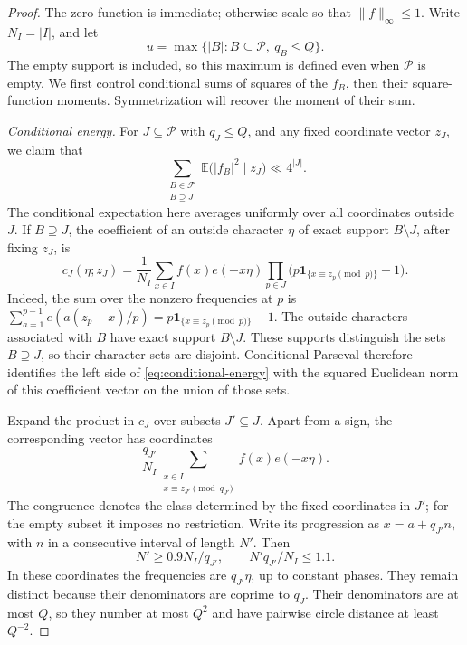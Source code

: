 \begin{proof}
The zero function is immediate; otherwise scale so that
\(\|f\|_\infty\le1\).  Write \(N_I=|I|\), and let
\[
 u=\max\{|B|:B\subseteq\mathcal P,\ q_B\le Q\}.
\]
The empty support is included, so this maximum is defined even when
\(\mathcal P\) is empty.
We first control conditional sums of squares of the \(f_B\), then their
square-function moments.  Symmetrization will recover the moment of
their sum.

\smallskip
\noindent\emph{Conditional energy.}
For \(J\subseteq\mathcal P\) with \(q_J\le Q\), and any fixed
coordinate vector \(z_J\), we claim that
\begin{equation}
 \sum_{\substack{B\in\mathcal F\\B\supseteq J}}
       \mathbb E\bigl(|f_B|^2\mid z_J\bigr)\ll4^{|J|}.
 \label{eq:conditional-energy}
\end{equation}
The conditional expectation here averages uniformly over all coordinates
outside \(J\).  If \(B\supseteq J\), the coefficient of an outside
character \(\eta\) of exact support \(B\setminus J\), after fixing
\(z_J\), is
\[
 c_J(\eta;z_J)
 =\frac1{N_I}\sum_{x\in I}f(x)e(-x\eta)
       \prod_{p\in J}\bigl(p\mathbf 1_{\{x\equiv z_p\pmod p\}}-1\bigr).
\]
Indeed, the sum over the nonzero frequencies at \(p\) is
\(\sum_{a=1}^{p-1}e(a(z_p-x)/p)
=p\mathbf 1_{\{x\equiv z_p\pmod p\}}-1\).
The outside characters associated with \(B\) have exact support
\(B\setminus J\).  These supports distinguish the sets \(B\supseteq J\),
so their character sets are disjoint.  Conditional Parseval therefore
identifies the left side of \eqref{eq:conditional-energy} with the squared
Euclidean norm of this coefficient vector on the union of those sets.

Expand the product in \(c_J\) over subsets \(J'\subseteq J\).
Apart from a sign, the corresponding vector has coordinates
\[
 \frac{q_{J'}}{N_I}
 \sum_{\substack{x\in I\\x\equiv z_{J'}\pmod{q_{J'}}}}
                   f(x)e(-x\eta).
\]
The congruence denotes the class determined by the fixed coordinates in
\(J'\); for the empty subset it imposes no restriction.  Write its
progression as \(x=a+q_{J'}n\), with \(n\) in a consecutive interval
of length \(N'\).  Then
\[
 N'\ge0.9N_I/q_{J'},
 \qquad N'q_{J'}/N_I\le1.1.
\]
In these coordinates the frequencies are \(q_{J'}\eta\), up to
constant phases.  They remain distinct because their denominators are
coprime to \(q_J\).  Their denominators are at most \(Q\), so they
number at most \(Q^2\) and have pairwise circle distance at least
\(Q^{-2}\).


\end{proof}
